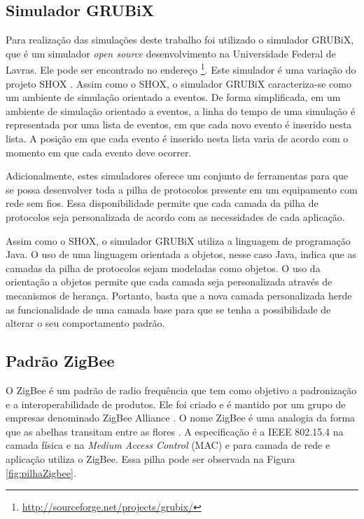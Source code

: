 \subsection{Simulador GRUBiX}

Para realização das simulações deste trabalho foi utilizado o simulador GRUBiX, que é um simulador \emph{open source} desenvolvimento na Universidade Federal de Lavras. Ele pode ser encontrado no endereço \footnote{\url{http://sourceforge.net/projects/grubix/}}. Este simulador é uma variação do projeto SHOX \cite{Lessmann:2008}. Assim como o SHOX, o simulador GRUBiX caracteriza-se como um ambiente de simulação orientado a eventos. De forma simplificada, em um ambiente de simulação orientado a eventos, a linha do tempo de uma simulação é representada por uma lista de eventos, em que cada novo evento é inserido nesta lista. A posição em que cada evento é inserido nesta lista varia de acordo com o momento em que cada evento deve ocorrer.

Adicionalmente, estes simuladores oferece um conjunto de ferramentas para que se possa desenvolver toda a pilha de protocolos presente em um equipamento com rede sem fios. Essa disponibilidade permite que cada camada da pilha de protocolos seja personalizada de acordo com as necessidades de cada aplicação.

Assim como o SHOX, o simulador GRUBiX utiliza a linguagem de programação Java. O uso de uma linguagem orientada a objetos, nesse caso Java, indica que as camadas da pilha de protocolos sejam modeladas como objetos. O uso da orientação a objetos permite que cada camada seja personalizada através de mecanismos de herança. Portanto, basta que a nova camada personalizada herde as funcionalidade de uma camada base para que se tenha a possibilidade de alterar o seu comportamento padrão.

\subsection{Padrão ZigBee}

O ZigBee é um padrão de radio frequência que tem como objetivo a padronização e a interoperabilidade de produtos. Ele foi criado e é mantido por um grupo de empresas denominado ZigBee Alliance \cite{ZigBeeAlliance:2015}. O nome ZigBee é uma analogia da forma que as abelhas transitam entre as flores \cite{Safaric:2006}.
A especificação é a IEEE 802.15.4 na camada física e na \emph{Medium Access Control} (MAC) e para camada de rede e aplicação utiliza o ZigBee. Essa pilha pode ser observada na Figura \ref{fig:pilhaZigbee}.

